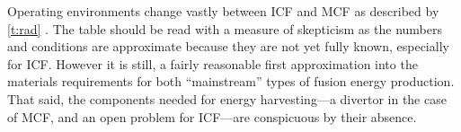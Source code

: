Operating environments change vastly between ICF and MCF as described by \cref{t:rad} \cite{openv}. The table should be read with a measure of skepticism as the numbers and conditions are approximate because they are not yet fully known, especially for ICF. However it is still, a fairly reasonable first approximation into the materials requirements for both ``mainstream'' types of fusion energy production. That said, the components needed for energy harvesting---a divertor in the case of MCF, and an open problem for ICF---are conspicuous by their absence.

\begin{table}
	\centering
\end{table}
